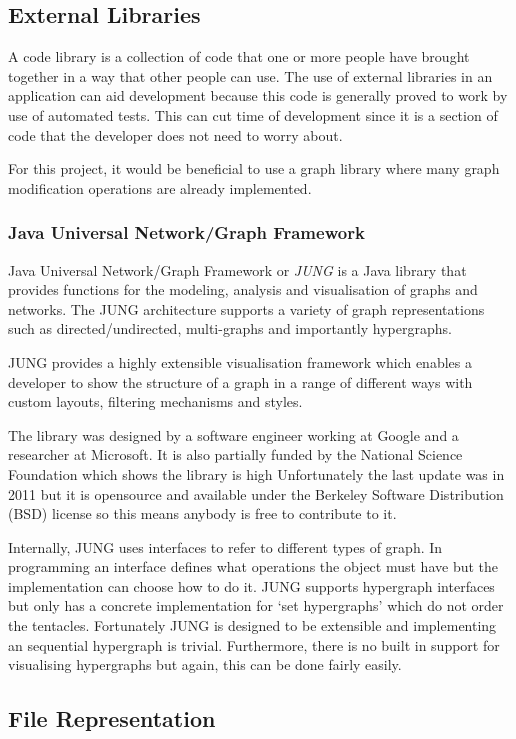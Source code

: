\subsection{External Libraries}
  A code library is a collection of code that one or more people have brought together in a way that other people can use. The use of external libraries in an application can aid development because this code is generally proved to work by use of automated tests. This can cut time of development since it is a section of code that the developer does not need to worry about.

  For this project, it would be beneficial to use a graph library where many graph modification operations are already implemented.

  \subsubsection{Java Universal Network/Graph Framework}
  Java Universal Network/Graph Framework or \emph{JUNG} is a Java library that provides functions for the modeling, analysis and visualisation of graphs and networks. The JUNG architecture supports a variety of graph representations such as directed/undirected, multi-graphs and importantly hypergraphs.

  JUNG provides a highly extensible visualisation framework which enables a developer to show the structure of a graph in a range of different ways with custom layouts, filtering mechanisms and styles.

  The library was designed by a software engineer working at Google and a researcher at Microsoft. It is also partially funded by the National Science Foundation which shows the library is high Unfortunately the last update was in 2011 but it is opensource and available under the Berkeley Software Distribution (BSD) license so this means anybody is free to contribute to it.

  Internally, JUNG uses interfaces to refer to different types of graph. In programming an interface defines what operations the object must have but the implementation can choose how to do it. JUNG supports hypergraph interfaces but only has a concrete implementation for `set hypergraphs' which do not order the tentacles. Fortunately JUNG is designed to be extensible and implementing an sequential hypergraph is trivial. Furthermore, there is no built in support for visualising hypergraphs but again, this can be done fairly easily.

\subsection{File Representation}
